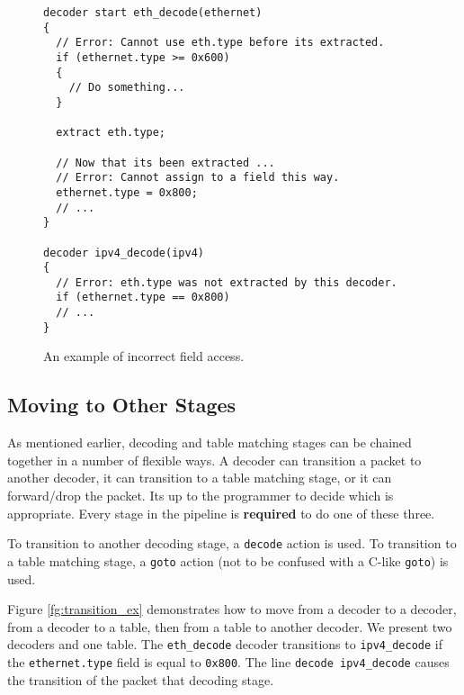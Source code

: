 \begin{figure}[ht]
\begin{lstlisting}
decoder start eth_decode(ethernet)
{
  // Error: Cannot use eth.type before its extracted.
  if (ethernet.type >= 0x600) 
  {
    // Do something...
  }
  
  extract eth.type;
  
  // Now that its been extracted ...
  // Error: Cannot assign to a field this way.
  ethernet.type = 0x800;
  // ...
}

decoder ipv4_decode(ipv4)
{
  // Error: eth.type was not extracted by this decoder.
  if (ethernet.type == 0x800)
  // ...
}
\end{lstlisting}
\caption{An example of incorrect field access.}
\label{fg:bad_access_ex}
\end{figure}

\subsection{Moving to Other Stages} \label{decoder_next_tut}

As mentioned earlier, decoding and table matching stages can be chained together in a number of flexible ways. A decoder can transition a packet to another decoder, it can transition to a table matching stage, or it can forward/drop the packet. Its up to the programmer to decide which is appropriate. Every stage in the pipeline is \textbf{required} to do one of these three.

To transition to another decoding stage, a \texttt{decode} action is used. To transition to a table matching stage, a \texttt{goto} action (not to be confused with a C-like \texttt{goto}) is used. 

Figure \ref{fg:transition_ex} demonstrates how to move from a decoder to a decoder, from a decoder to a table, then from a table to another decoder. We present two decoders and one table. The \texttt{eth\_decode} decoder transitions to \texttt{ipv4\_decode} if the \texttt{ethernet.type} field is equal to \texttt{0x800}. The line \texttt{decode ipv4\_decode} causes the transition of the packet that decoding stage.

